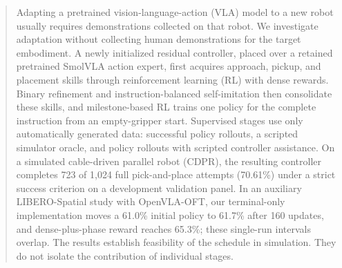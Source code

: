 \begin{abstract}
Adapting a pretrained vision-language-action (VLA) model to a new robot usually requires demonstrations collected on that robot. We investigate adaptation without collecting human demonstrations for the target embodiment. A newly initialized residual controller, placed over a retained pretrained SmolVLA action expert, first acquires approach, pickup, and placement skills through reinforcement learning (RL) with dense rewards. Binary refinement and instruction-balanced self-imitation then consolidate these skills, and milestone-based RL trains one policy for the complete instruction from an empty-gripper start. Supervised stages use only automatically generated data: successful policy rollouts, a scripted simulator oracle, and policy rollouts with scripted controller assistance. On a simulated cable-driven parallel robot (CDPR), the resulting controller completes 723 of 1,024 full pick-and-place attempts (70.61\%) under a strict success criterion on a development validation panel. In an auxiliary LIBERO-Spatial study with OpenVLA-OFT, our terminal-only implementation moves a 61.0\% initial policy to 61.7\% after 160 updates, and dense-plus-phase reward reaches 65.3\%; these single-run intervals overlap. The results establish feasibility of the schedule in simulation. They do not isolate the contribution of individual stages.
\end{abstract}
